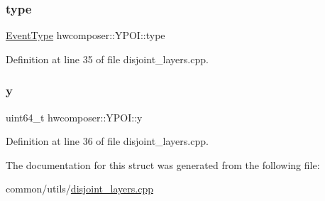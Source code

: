 \subsubsection{\texorpdfstring{type}{type}}
{\footnotesize\ttfamily \mbox{\hyperlink{namespacehwcomposer_a4600de8fd807f9d693b865758557d612}{Event\+Type}} hwcomposer\+::\+Y\+P\+O\+I\+::type}



Definition at line 35 of file disjoint\+\_\+layers.\+cpp.

\mbox{\label{structhwcomposer_1_1YPOI_a0a1025b2b6f048c7d8c6ff1571de8ad2}} 
\subsubsection{\texorpdfstring{y}{y}}
{\footnotesize\ttfamily uint64\+\_\+t hwcomposer\+::\+Y\+P\+O\+I\+::y}



Definition at line 36 of file disjoint\+\_\+layers.\+cpp.



The documentation for this struct was generated from the following file\+:\begin{DoxyCompactItemize}
\item 
common/utils/\mbox{\hyperlink{disjoint__layers_8cpp}{disjoint\+\_\+layers.\+cpp}}\end{DoxyCompactItemize}
